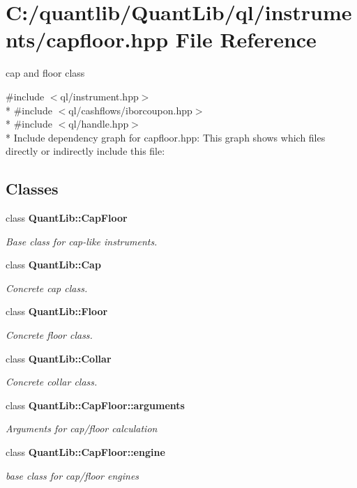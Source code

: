 \section{C\+:/quantlib/\+Quant\+Lib/ql/instruments/capfloor.hpp File Reference}
\label{capfloor_8hpp}


cap and floor class  


{\ttfamily \#include $<$ql/instrument.\+hpp$>$}\\*
{\ttfamily \#include $<$ql/cashflows/iborcoupon.\+hpp$>$}\\*
{\ttfamily \#include $<$ql/handle.\+hpp$>$}\\*
Include dependency graph for capfloor.\+hpp\+:
This graph shows which files directly or indirectly include this file\+:
\subsection*{Classes}
\begin{DoxyCompactItemize}
\item 
class {\bf Quant\+Lib\+::\+Cap\+Floor}
\begin{DoxyCompactList}\small\item\em Base class for cap-\/like instruments. \end{DoxyCompactList}\item 
class {\bf Quant\+Lib\+::\+Cap}
\begin{DoxyCompactList}\small\item\em Concrete cap class. \end{DoxyCompactList}\item 
class {\bf Quant\+Lib\+::\+Floor}
\begin{DoxyCompactList}\small\item\em Concrete floor class. \end{DoxyCompactList}\item 
class {\bf Quant\+Lib\+::\+Collar}
\begin{DoxyCompactList}\small\item\em Concrete collar class. \end{DoxyCompactList}\item 
class {\bf Quant\+Lib\+::\+Cap\+Floor\+::arguments}
\begin{DoxyCompactList}\small\item\em Arguments for cap/floor calculation \end{DoxyCompactList}\item 
class {\bf Quant\+Lib\+::\+Cap\+Floor\+::engine}
\begin{DoxyCompactList}\small\item\em base class for cap/floor engines \end{DoxyCompactList}\end{DoxyCompactItemize}
